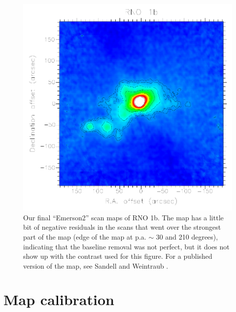 \documentclass[twoside,11pt,noabs]{starlink}
\begin{document}
\begin{figure}
\begin{center}
\includegraphics[width=\textwidth]{sc11_fig10}
\caption[Our final ``Emerson2'' scan maps of RNO 1b.]{Our final ``Emerson2'' scan maps of RNO 1b. The map has a
little bit of negative residuals in the scans that went over the
strongest part of the map (edge of the map at p.a. $\sim$ 30 and 210
degrees), indicating that the baseline removal was not perfect, but it
does not show up with the contrast used for this figure. For a
published version of the map, see Sandell and Weintraub \cite{Sandell01}.}
\label{fig:final}
\end{center}
\end{figure}

\section{ Map calibration  \label{Calibration}}
\end{document}
